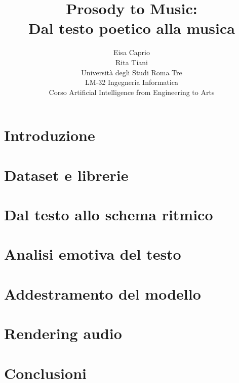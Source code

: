 \documentclass[a4paper,11pt]{report}
\title{Prosody to Music:\\ Dal testo poetico alla musica}
\author{Eisa Caprio\\ Rita Tiani \\[0.3em]
\small{Universit\`a degli Studi Roma Tre} \\
\small{LM-32 Ingegneria Informatica}\\
\small{Corso Artificial Intelligence from Engineering to Arts}}
\date{}
\begin{document}
\maketitle


\tableofcontents
\newpage

\chapter{Introduzione}


\chapter{Dataset e librerie}


\chapter{Dal testo allo schema ritmico}


\chapter{Analisi emotiva del testo}


\chapter{Addestramento del modello}


\chapter{Rendering audio}


\chapter{Conclusioni}


% 
% 
\end{document}
